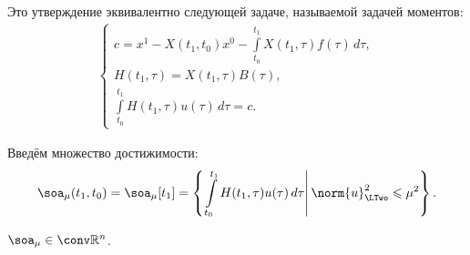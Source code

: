 Это утверждение эквивалентно следующей задаче, называемой задачей моментов:
\begin{gather}
\label{ourTask}
	\begin{cases}
	  \displaystyle
	  c = x^1 - X(t_1, t_0) x^0 - \int\limits_{t_0}^{t_1} X(t_1, \tau) f(\tau)\,d\tau,\\
	  H(t_1, \tau) = X(t_1, \tau) B(\tau),\\
	  \displaystyle
	  \int\limits_{t_0}^{t_1} H(t_1, \tau) u(\tau)\,d\tau = c.
	\end{cases}
\end{gather}

Введём множество достижимости:
\begin{gather*}
	\soa_\mu(t_1, t_0) = \soa_\mu[t_1] =
	\left\lbrace\left.
	  \int\limits_{t_0}^{t_1} H(t_1, \tau) u(\tau)\,d\tau \right| \norm{u}_\LTwo^2 \leqslant \mu^2
	\right\rbrace.
\end{gather*}

\begin{stm}
	$\soa_\mu \in \conv \mathbb{R}^n$.
\end{stm}

